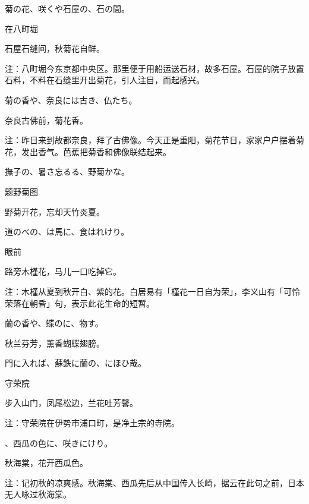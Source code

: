 \begin{haiku}
    {\FH 菊の花、咲くや石屋の、石の間。}

    {\FK 在八町堀}

    {\FK 石屋石缝间，秋菊花自鲜。}

    {\FT 注：八町堀今东京都中央区。那里便于用船运送石材，故多石屋。石屋的院子放置石料，不料在石缝里开出菊花，引人注目，而起感兴。}
\end{haiku}

\begin{haiku}
    {\FH 菊の香や、奈良には古き、仏たち。}

    {\FK 奈良古佛前，菊花香。}

    {\FT 注：昨日来到故都奈良，拜了古佛像。今天正是重阳，菊花节日，家家户户摆着菊花，发出香气。芭蕉把菊香和佛像联结起来。}
\end{haiku}

\begin{haiku}
    {\FH 撫子の、暑さ忘るる、野菊かな。}

    {\FK 题野菊图}

    {\FK 野菊开花，忘却天竹炎夏。}
\end{haiku}

\begin{haiku}
    {\FH 道のべの、は馬に、食はれけり。}

    {\FK 眼前}

    {\FK 路旁木槿花，马儿一口吃掉它。}

    {\FT 注：木槿从夏到秋开白、紫的花。白居易有「槿花一日自为荣」，李义山有「可怜荣落在朝昏」句，表示此花生命的短暂。}
\end{haiku}

\begin{haiku}
    {\FH 蘭の香や、蝶のに、物す。}

    {\FK 秋兰芬芳，薰香蝴蝶翅膀。}
\end{haiku}

\begin{haiku}
    {\FH 門に入れば、蘇鉄に蘭の、にほひ哉。}

    {\FK 守荣院}

    {\FK 步入山门，凤尾松边，兰花吐芳馨。}

    {\FT 注：守荣院在伊势市浦口町，是净土宗的寺院。}
\end{haiku}

\begin{haiku}
    {\FH {}、西瓜の色に、咲きにけり。}

    {\FK 秋海棠，花开西瓜色。}

    {\FT 注：记初秋的凉爽感。秋海棠、西瓜先后从中国传入长崎，据云在此句之前，日本无人咏过秋海棠。}
\end{haiku}

